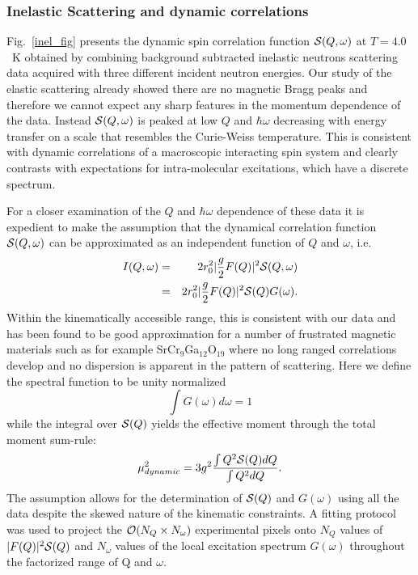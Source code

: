 \documentclass[%
 reprint,
superscriptaddress,
 amsmath,amssymb,
 aps,
 prb,
]{revtex4-2}
\begin{document}
\subsubsection{Inelastic Scattering and dynamic correlations}
Fig.~\ref{inel_fig} presents the dynamic spin correlation function ${\cal S}(Q,\omega)$ at $T=4.0$~K obtained by combining background subtracted inelastic neutrons scattering data acquired with three different incident neutron energies. Our study of the elastic scattering already showed there are no magnetic Bragg peaks and therefore we cannot expect any sharp features in the momentum dependence of the data. Instead ${\cal S}(Q,\omega)$ is peaked at low $Q$ and $\hbar\omega$ decreasing with energy transfer on a scale that resembles the Curie-Weiss temperature. This is consistent with dynamic correlations of a macroscopic interacting spin system and clearly contrasts with expectations for intra-molecular excitations, which have a discrete spectrum. 

For a closer examination of the $Q$ and $\hbar\omega$ dependence of these data it is expedient to make the assumption that the dynamical correlation function ${\cal S}(Q,\omega)$ can be approximated as an independent function of $Q$ and $\omega$, i.e.
\begin{eqnarray}
    I(Q,\omega)&=&2r_0^2|\frac{g}{2}F(Q)|^2{\cal S}(Q,\omega) \nonumber \\
    &=&2r_0^2|\frac{g}{2}F(Q)|^2{\cal S}(Q)G(\omega).
    \label{factorization_eq_appendix}
\end{eqnarray}
Within the kinematically accessible range, this is consistent with our data and has been found to be good approximation for a number of frustrated magnetic materials such as for example SrCr$_9$Ga$_{12}$O$_{19}$ \cite{Lee1996Spin-glassMagnet,Yang2015SpinMagnet} where no long ranged correlations develop and no dispersion is apparent in the pattern of scattering. Here we define the spectral function to be unity normalized
\begin{equation}
    \int G(\omega)d\omega =1
    \label{norm_condition}
\end{equation}
while the integral over ${\cal S}(Q)$ yields the effective moment through the total moment sum-rule: 
\begin{equation}
    \mu_{dynamic}^2=3g^2\frac{\int Q^2 {\cal S}(Q)dQ}{\int Q^2 dQ}.
    \label{total_moment_eq}
\end{equation}
The assumption allows for the determination of ${\cal S}(Q)$ and $G(\omega)$ using all the data despite the skewed nature of the kinematic constraints.
A fitting protocol was used to project the ${\cal O}(N_Q\times N_\omega )$ experimental pixels onto $N_Q$ values of  $|F(Q)|^2{\cal S}(Q)$ and $N_\omega$ values of the local excitation spectrum $G(\omega )$ throughout the  factorized range of Q and $\omega$.  
\end{document}
